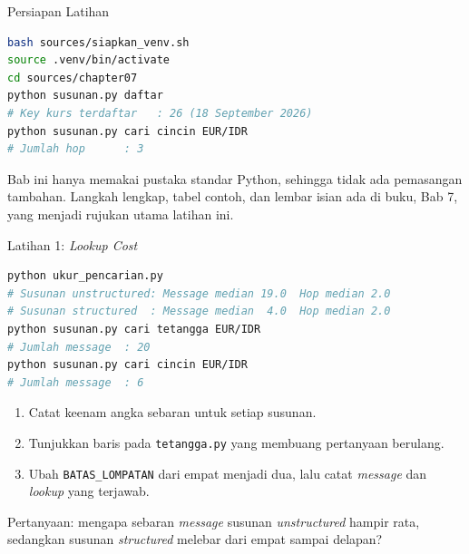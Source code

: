 \documentclass[aspectratio=169, table, 12pt]{beamer}
\begin{document}
\begin{frame}[fragile]{{\Large Persiapan Latihan}}
  \vspace{5pt}
\begin{lstlisting}[language=bash]
bash sources/siapkan_venv.sh
source .venv/bin/activate
cd sources/chapter07
python susunan.py daftar
# Key kurs terdaftar   : 26 (18 September 2026)
python susunan.py cari cincin EUR/IDR
# Jumlah hop      : 3
\end{lstlisting}

  \vspace{6pt}
  {\small Bab ini hanya memakai pustaka standar Python, sehingga tidak ada
  pemasangan tambahan. Langkah lengkap, tabel contoh, dan lembar isian ada di
  buku, Bab 7, yang menjadi rujukan utama latihan ini.}
\end{frame}

\begin{frame}[fragile]{{\Large Latihan 1: \textit{Lookup Cost}}}
  \vspace{3pt}
\begin{lstlisting}[language=bash]
python ukur_pencarian.py
# Susunan unstructured: Message median 19.0  Hop median 2.0
# Susunan structured  : Message median  4.0  Hop median 2.0
python susunan.py cari tetangga EUR/IDR
# Jumlah message  : 20
python susunan.py cari cincin EUR/IDR
# Jumlah message  : 6
\end{lstlisting}

  \vspace{3pt}
  \begin{enumerate}\small
    \item Catat keenam angka sebaran untuk setiap susunan.
    \item Tunjukkan baris pada \texttt{tetangga.py} yang membuang pertanyaan
          berulang.
    \item Ubah \texttt{BATAS\_LOMPATAN} dari empat menjadi dua, lalu catat
          \textit{message} dan \textit{lookup} yang terjawab.
  \end{enumerate}

  \vspace{3pt}
  {\small Pertanyaan: mengapa sebaran \textit{message} susunan \textit{unstructured} hampir
  rata, sedangkan susunan \textit{structured} melebar dari empat sampai delapan?}
\end{frame}
\end{document}
